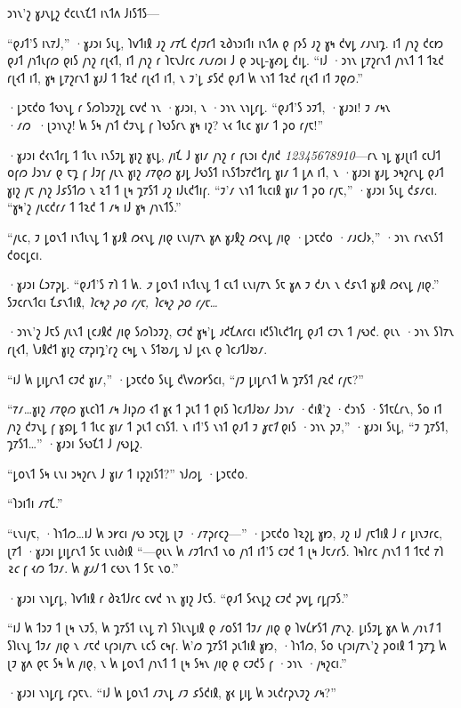 𐑮𐑪𐑯'𐑟 𐑣𐑨𐑯𐑛𐑟 𐑒𐑤𐑧𐑯𐑗𐑑 𐑦𐑯𐑑𐑵 𐑓𐑦𐑕𐑑𐑕—

“𐑞𐑨𐑑'𐑕 𐑦𐑯𐑳𐑓,” ·𐑣𐑨𐑮𐑦 𐑕𐑧𐑛, 𐑐𐑫𐑑𐑦𐑙 𐑨𐑟 𐑥𐑳𐑗 𐑒𐑢𐑲𐑩𐑑 𐑷𐑔𐑪𐑮𐑦𐑑𐑦 𐑦𐑯𐑑𐑵 𐑞 𐑝𐑶𐑕 𐑨𐑟 𐑣𐑰 𐑒𐑫𐑛 𐑥𐑨𐑯𐑦𐑡. 𐑦𐑑 𐑢𐑪𐑟 𐑒𐑤𐑽 𐑞𐑨𐑑 𐑢𐑪𐑑𐑧𐑝𐑼 𐑞𐑦𐑕 𐑢𐑪𐑟 𐑩𐑚𐑬𐑑, 𐑦𐑑 𐑢𐑪𐑟 𐑩 𐑐𐑱𐑯𐑓𐑩𐑤 𐑥𐑧𐑥𐑼𐑦 𐑓 𐑞 𐑮𐑧𐑛-𐑣𐑺𐑛 𐑒𐑦𐑛. “𐑦𐑓 ·𐑮𐑪𐑯 𐑛𐑳𐑟𐑩𐑯𐑑 𐑢𐑪𐑯𐑑 𐑑 𐑑𐑷𐑒 𐑩𐑚𐑬𐑑 𐑦𐑑, 𐑣𐑰 𐑛𐑳𐑟𐑩𐑯𐑑 𐑣𐑨𐑓 𐑑 𐑑𐑷𐑒 𐑩𐑚𐑬𐑑 𐑦𐑑, 𐑯 𐑲'𐑛 𐑭𐑕𐑒 𐑞𐑨𐑑 𐑿 𐑯𐑪𐑑 𐑑𐑷𐑒 𐑩𐑚𐑬𐑑 𐑦𐑑 𐑲𐑞𐑼.”

·𐑛𐑮𐑱𐑒𐑴 𐑑𐑻𐑯𐑛 𐑩 𐑕𐑼𐑐𐑮𐑲𐑟𐑛 𐑤𐑫𐑒 𐑪𐑯 ·𐑣𐑨𐑮𐑦, 𐑯 ·𐑮𐑪𐑯 𐑯𐑪𐑛𐑩𐑛. “𐑞𐑨𐑑'𐑕 𐑮𐑲𐑑, ·𐑣𐑨𐑮𐑦! 𐑲 𐑥𐑰𐑯 ·𐑥𐑼~·𐑚𐑮𐑪𐑯𐑟! 𐑿 𐑕𐑰 𐑢𐑪𐑑 𐑒𐑲𐑯𐑛 𐑝 𐑐𐑻𐑕𐑩𐑯 𐑣𐑰 𐑦𐑟? 𐑯𐑬 𐑑𐑧𐑤 𐑣𐑦𐑥 𐑑 𐑜𐑴 𐑩𐑢𐑱!”

·𐑣𐑨𐑮𐑦 𐑒𐑬𐑯𐑑𐑩𐑛 𐑑 𐑑𐑧𐑯 𐑦𐑯𐑕𐑲𐑛 𐑣𐑦𐑟 𐑣𐑧𐑛, 𐑢𐑦𐑗 𐑓 𐑣𐑦𐑥 𐑢𐑪𐑟 𐑩 𐑝𐑧𐑮𐑦 𐑒𐑢𐑦𐑒 \emph{12345678910}—𐑩𐑯 𐑪𐑛 𐑣𐑨𐑚𐑦𐑑 𐑤𐑧𐑓𐑑 𐑴𐑝𐑼 𐑓𐑮𐑪𐑥 𐑞 𐑱𐑡 𐑝 𐑓𐑲𐑝 𐑢𐑧𐑯 𐑣𐑦𐑟 𐑥𐑳𐑞𐑼 𐑣𐑨𐑛 𐑓𐑻𐑕𐑑 𐑦𐑯𐑕𐑑𐑮𐑳𐑒𐑑𐑩𐑛 𐑣𐑦𐑥 𐑑 𐑛𐑵 𐑦𐑑, 𐑯 ·𐑣𐑨𐑮𐑦 𐑣𐑨𐑛 𐑮𐑰𐑟𐑩𐑯𐑛 𐑞𐑨𐑑 𐑣𐑦𐑟 𐑢𐑱 𐑢𐑪𐑟 𐑓𐑭𐑕𐑑𐑼 𐑯 𐑷𐑑 𐑑 𐑚𐑰 𐑡𐑳𐑕𐑑 𐑨𐑟 𐑦𐑓𐑧𐑒𐑑𐑦𐑝. “𐑲'𐑥 𐑯𐑪𐑑 𐑑𐑧𐑤𐑦𐑙 𐑣𐑦𐑥 𐑑 𐑜𐑴 𐑩𐑢𐑱,” ·𐑣𐑨𐑮𐑦 𐑕𐑧𐑛 𐑒𐑭𐑥𐑤𐑦. “𐑣𐑰'𐑟 𐑢𐑧𐑤𐑒𐑩𐑥 𐑑 𐑑𐑷𐑒 𐑑 𐑥𐑰 𐑦𐑓 𐑣𐑰 𐑢𐑪𐑯𐑑𐑕.”

“𐑢𐑧𐑤, 𐑲 𐑛𐑴𐑯𐑑 𐑦𐑯𐑑𐑧𐑯𐑛 𐑑 𐑣𐑨𐑙 𐑼𐑬𐑯𐑛 𐑢𐑦𐑞 𐑧𐑯𐑦𐑢𐑳𐑯 𐑣𐑵 𐑣𐑨𐑙𐑟 𐑼𐑬𐑯𐑛 𐑢𐑦𐑞 ·𐑛𐑮𐑱𐑒𐑴 ·𐑥𐑨𐑤𐑓𐑶,” ·𐑮𐑪𐑯 𐑩𐑯𐑬𐑯𐑕𐑑 𐑒𐑴𐑤𐑛𐑤𐑦.

·𐑣𐑨𐑮𐑦 𐑖𐑮𐑳𐑜𐑛. “𐑞𐑨𐑑'𐑕 𐑳𐑐 𐑑 𐑿. \emph{𐑲} 𐑛𐑴𐑯𐑑 𐑦𐑯𐑑𐑧𐑯𐑛 𐑑 𐑤𐑧𐑑 𐑧𐑯𐑦𐑢𐑳𐑯 𐑕𐑱 𐑣𐑵 𐑲 𐑒𐑨𐑯 𐑯 𐑒𐑭𐑯𐑑 𐑣𐑨𐑙 𐑼𐑬𐑯𐑛 𐑢𐑦𐑞.” 𐑕𐑲𐑤𐑩𐑯𐑑𐑤𐑦 𐑗𐑭𐑯𐑑𐑦𐑙, \emph{𐑐𐑤𐑰𐑟 𐑜𐑴 𐑩𐑢𐑱, 𐑐𐑤𐑰𐑟 𐑜𐑴 𐑩𐑢𐑱…}

·𐑮𐑪𐑯'𐑟 𐑓𐑱𐑕 𐑢𐑧𐑯𐑑 𐑚𐑤𐑨𐑙𐑒 𐑢𐑦𐑞 𐑕𐑼𐑐𐑮𐑲𐑟, 𐑤𐑲𐑒 𐑣𐑰'𐑛 𐑨𐑒𐑗𐑵𐑩𐑤𐑦 𐑦𐑒𐑕𐑐𐑧𐑒𐑑𐑩𐑛 𐑞𐑨𐑑 𐑤𐑲𐑯 𐑑 𐑢𐑻𐑒. 𐑞𐑧𐑯 ·𐑮𐑪𐑯 𐑕𐑐𐑳𐑯 𐑩𐑚𐑬𐑑, 𐑘𐑨𐑙𐑒𐑑 𐑣𐑦𐑟 𐑤𐑳𐑜𐑦𐑡'𐑩𐑟 𐑤𐑰𐑛 𐑯 𐑕𐑑𐑹𐑥𐑛 𐑪𐑓 𐑛𐑬𐑯 𐑞 𐑐𐑤𐑨𐑑𐑓𐑹𐑥.

“𐑦𐑓 𐑿 𐑛𐑦𐑛𐑩𐑯𐑑 𐑤𐑲𐑒 𐑣𐑦𐑥,” ·𐑛𐑮𐑱𐑒𐑴 𐑕𐑧𐑛 𐑒𐑘𐑫𐑼𐑾𐑕𐑤𐑦, “𐑢𐑲 𐑛𐑦𐑛𐑩𐑯𐑑 𐑿 𐑡𐑳𐑕𐑑 𐑢𐑷𐑒 𐑩𐑢𐑱?”

“𐑳𐑥…𐑣𐑦𐑟 𐑥𐑳𐑞𐑼 𐑣𐑧𐑤𐑐𐑑 𐑥𐑰 𐑓𐑦𐑜𐑼 𐑬𐑑 𐑣𐑬 𐑑 𐑜𐑧𐑑 𐑑 𐑞𐑦𐑕 𐑐𐑤𐑨𐑑𐑓𐑹𐑥 𐑓𐑮𐑪𐑥 ·𐑒𐑦𐑙'𐑟 ·𐑒𐑮𐑪𐑕 ·𐑕𐑑𐑱𐑖𐑩𐑯, 𐑕𐑴 𐑦𐑑 𐑢𐑪𐑟 𐑒𐑲𐑯𐑛 𐑝 𐑣𐑸𐑛 𐑑 𐑑𐑧𐑤 𐑣𐑦𐑥 𐑑 𐑜𐑧𐑑 𐑤𐑪𐑕𐑑. 𐑯 𐑦𐑑'𐑕 𐑯𐑪𐑑 𐑞𐑨𐑑 𐑲 \emph{𐑣𐑱𐑑} 𐑞𐑦𐑕 ·𐑮𐑪𐑯 𐑜𐑲,” ·𐑣𐑨𐑮𐑦 𐑕𐑧𐑛, “𐑲 𐑡𐑳𐑕𐑑, 𐑡𐑳𐑕𐑑…” ·𐑣𐑨𐑮𐑦 𐑕𐑻𐑗𐑑 𐑓 𐑢𐑻𐑛𐑟.

“𐑛𐑴𐑯𐑑 𐑕𐑰 𐑧𐑯𐑦 𐑮𐑰𐑟𐑩𐑯 𐑓 𐑣𐑦𐑥 𐑑 𐑦𐑜𐑟𐑦𐑕𐑑?” 𐑪𐑓𐑼𐑛 ·𐑛𐑮𐑱𐑒𐑴.

“𐑐𐑮𐑦𐑑𐑦 𐑥𐑳𐑗.”

“𐑧𐑯𐑦𐑢𐑱, ·𐑐𐑪𐑑𐑼…𐑦𐑓 𐑿 𐑮𐑾𐑤𐑦 𐑢𐑻 𐑮𐑱𐑟𐑛 𐑚𐑲 ·𐑥𐑳𐑜𐑩𐑤𐑟—” ·𐑛𐑮𐑱𐑒𐑴 𐑐𐑷𐑟𐑛 𐑣𐑽, 𐑨𐑟 𐑦𐑓 𐑢𐑱𐑑𐑦𐑙 𐑓 𐑩 𐑛𐑦𐑯𐑲𐑩𐑤, 𐑚𐑳𐑑 ·𐑣𐑨𐑮𐑦 𐑛𐑦𐑛𐑩𐑯𐑑 𐑕𐑱 𐑧𐑯𐑦𐑔𐑦𐑙 “—𐑞𐑧𐑯 𐑿 𐑥𐑲𐑑𐑩𐑯𐑑 𐑯𐑴 𐑢𐑪𐑑 𐑦𐑑'𐑕 𐑤𐑲𐑒 𐑑 𐑚𐑰 𐑓𐑱𐑥𐑩𐑕. 𐑐𐑰𐑐𐑩𐑤 𐑢𐑪𐑯𐑑 𐑑 𐑑𐑱𐑒 𐑳𐑐 \emph{𐑷𐑤} 𐑝 𐑬𐑼 𐑑𐑲𐑥. 𐑿 \emph{𐑣𐑨𐑓} 𐑑 𐑤𐑻𐑯 𐑑 𐑕𐑱 𐑯𐑴.”

·𐑣𐑨𐑮𐑦 𐑯𐑪𐑛𐑩𐑛, 𐑐𐑫𐑑𐑦𐑙 𐑩 𐑔𐑷𐑑𐑓𐑩𐑤 𐑤𐑫𐑒 𐑪𐑯 𐑣𐑦𐑟 𐑓𐑱𐑕. “𐑞𐑨𐑑 𐑕𐑬𐑯𐑛𐑟 𐑤𐑲𐑒 𐑜𐑫𐑛 𐑩𐑛𐑝𐑲𐑕.”

“𐑦𐑓 𐑿 𐑑𐑮𐑲 𐑑 𐑚𐑰 𐑯𐑲𐑕, 𐑿 𐑡𐑳𐑕𐑑 𐑧𐑯𐑛 𐑳𐑐 𐑕𐑐𐑧𐑯𐑛𐑦𐑙 𐑞 𐑥𐑴𐑕𐑑 𐑑𐑲𐑥 𐑢𐑦𐑞 𐑞 𐑐𐑫𐑖𐑾𐑕𐑑 𐑢𐑳𐑯𐑟. 𐑛𐑦𐑕𐑲𐑛 𐑣𐑵 𐑿 \emph{𐑢𐑪𐑯𐑑} 𐑑 𐑕𐑐𐑧𐑯𐑛 𐑑𐑲𐑥 𐑢𐑦𐑞 𐑯 𐑥𐑱𐑒 𐑧𐑝𐑮𐑦𐑢𐑳𐑯 𐑧𐑤𐑕 𐑤𐑰𐑝. 𐑿'𐑼 𐑡𐑳𐑕𐑑 𐑜𐑧𐑑𐑦𐑙 𐑣𐑽, ·𐑐𐑪𐑑𐑼, 𐑕𐑴 𐑧𐑝𐑮𐑦𐑢𐑳𐑯'𐑟 𐑜𐑴𐑦𐑙 𐑑 𐑡𐑳𐑡 𐑿 𐑚𐑲 𐑣𐑵 𐑞𐑱 𐑕𐑰 𐑿 𐑢𐑦𐑞, 𐑯 𐑿 𐑛𐑴𐑯𐑑 𐑢𐑪𐑯𐑑 𐑑 𐑚𐑰 𐑕𐑰𐑯 𐑢𐑦𐑞 𐑞 𐑤𐑲𐑒𐑕 𐑝 ·𐑮𐑪𐑯 ·𐑢𐑰𐑟𐑤𐑦.”

·𐑣𐑨𐑮𐑦 𐑯𐑪𐑛𐑩𐑛 𐑩𐑜𐑱𐑯. “𐑦𐑓 𐑿 𐑛𐑴𐑯𐑑 𐑥𐑲𐑯𐑛 𐑥𐑲 𐑭𐑕𐑒𐑦𐑙, 𐑣𐑬 𐑛𐑦𐑛 𐑿 𐑮𐑧𐑒𐑩𐑜𐑯𐑲𐑟 𐑥𐑰?”

